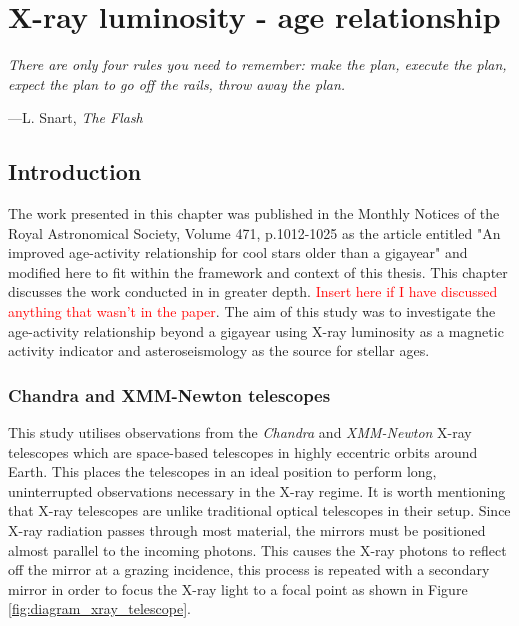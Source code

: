 
\chapter{X-ray luminosity - age relationship} %

\label{Chapter3} %
\newcommand{\Chandra}{\textit{Chandra}\xspace}
\newcommand{\XMM}{\textit{XMM-Newton}\xspace}

\epigraph{\itshape There are only four rules you need to remember: make the plan, execute the plan, expect the plan to go off the rails, throw away the plan.}{---L. Snart, \itshape The Flash}

\section{Introduction}
The work presented in this chapter was published in the Monthly Notices of the Royal Astronomical Society, Volume 471, p.1012-1025 as the article entitled "An improved age-activity relationship for cool stars older than a gigayear" \citep{Booth_etal_2017} and modified here to fit within the framework and context of this thesis. This chapter discusses the work conducted in \citet{Booth_etal_2017} in greater depth. \textcolor{red}{Insert here if I have discussed anything that wasn't in the paper}. The aim of this study was to investigate the age-activity relationship beyond a gigayear using X-ray luminosity as a magnetic activity indicator and asteroseismology as the source for stellar ages.

\subsection{Chandra and XMM-Newton telescopes}
This study utilises observations from the \Chandra and \XMM X-ray telescopes which are space-based telescopes in highly eccentric orbits around Earth. This places the telescopes in an ideal position to perform long, uninterrupted observations necessary in the X-ray regime. It is worth mentioning that X-ray telescopes are unlike traditional optical telescopes in their setup. Since X-ray radiation passes through most material, the mirrors must be positioned almost parallel to the incoming photons. This causes the X-ray photons to reflect off the mirror at a grazing incidence, this process is repeated with a secondary mirror in order to focus the X-ray light to a focal point as shown in Figure \ref{fig:diagram_xray_telescope}.


